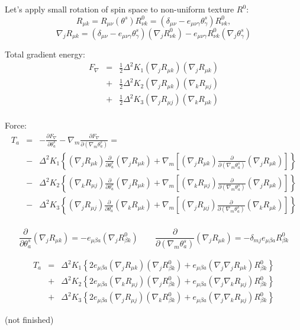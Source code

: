 \documentclass[a4paper]{article}
\begin{document}
Let's apply small rotation of spin space to non-uniform texture $R^0$:
$$
R_{\mu k} = R_{\mu\nu}(\theta^s) R^0_{\nu k} =
(\delta_{\mu\nu} - e_{\mu\nu\gamma}\theta^s_\gamma) R^0_{\nu k},
$$
$$
\nabla_j R_{\mu k} =
(\delta_{\mu\nu} - e_{\mu\nu\gamma}\theta^s_\gamma)(\nabla_j R^0_{\nu k})
- e_{\mu\nu \gamma} R^0_{\nu k} (\nabla_j \theta^s_\gamma)
$$

Total gradient energy:
\begin{eqnarray*}
F_\nabla
&=& \frac12 \Delta^2 K_1
 (\nabla_j R_{\mu k})(\nabla_j R_{\mu k})\\
&+& \frac12 \Delta^2 K_2
 (\nabla_j R_{\mu k})(\nabla_k R_{\mu j})\\
&+& \frac12 \Delta^2 K_3
 (\nabla_j R_{\mu j})(\nabla_k R_{\mu k})\\
\end{eqnarray*}

Force:
\begin{eqnarray*}
T_a
&=& - \frac{\partial F_\nabla}{\partial\theta^s_a}
- \nabla_m \frac{\partial F_\nabla}{\partial(\nabla_m\theta^s_a)} = \\
&-& \Delta^2 K_1 \left\{
  (\nabla_j R_{\mu k})
  \frac{\partial}{\partial\theta^s_a} (\nabla_j R_{\mu k})
+ \nabla_m \left[
  (\nabla_j R_{\mu k})
  \frac{\partial}{\partial(\nabla_m\theta^s_a)} (\nabla_j R_{\mu k})\right]
\right\}
\\
&-& \Delta^2 K_2 \left\{
  (\nabla_k R_{\mu j})
  \frac{\partial}{\partial\theta^s_a} (\nabla_j R_{\mu k})
+ \nabla_m \left[
  (\nabla_k R_{\mu j})
  \frac{\partial}{\partial(\nabla_m\theta^s_a)} (\nabla_j R_{\mu k})\right]
\right\}
\\
&-& \Delta^2 K_3 \left\{
  (\nabla_j R_{\mu j})
  \frac{\partial}{\partial\theta^s_a} (\nabla_k R_{\mu k})
+ \nabla_m \left[
  (\nabla_j R_{\mu j})
  \frac{\partial}{\partial(\nabla_m\theta^s_a)} (\nabla_k R_{\mu k})\right]
\right\}
\\
\end{eqnarray*}

$$
\frac{\partial}{\partial\theta^s_a} (\nabla_j R_{\mu k}) =
- e_{\mu\beta a} (\nabla_j R^0_{\beta k})
\qquad
\frac{\partial}{\partial(\nabla_m\theta^s_a)} (\nabla_j R_{\mu k}) =
- \delta_{mj} e_{\mu\beta a} R^0_{\beta k}
$$

\begin{eqnarray*}
T_a
&=& \Delta^2 K_1 \left\{
  2e_{\mu\beta a} (\nabla_j R_{\mu k}) (\nabla_j R^0_{\beta k})
+ e_{\mu\beta a} (\nabla_j \nabla_j R_{\mu k}) R^0_{\beta k}
\right\}
\\
&+& \Delta^2 K_2 \left\{
  2e_{\mu\beta a} (\nabla_k R_{\mu j}) (\nabla_j R^0_{\beta k})
+ e_{\mu\beta a} (\nabla_j \nabla_k R_{\mu j}) R^0_{\beta k}
\right\}
\\
&+& \Delta^2 K_3 \left\{
  2e_{\mu\beta a} (\nabla_j R_{\mu j}) (\nabla_k R^0_{\beta k})
+ e_{\mu\beta a} (\nabla_j \nabla_k R_{\mu j}) R^0_{\beta k}
\right\}
\end{eqnarray*}

(not finished)
\end{document}

